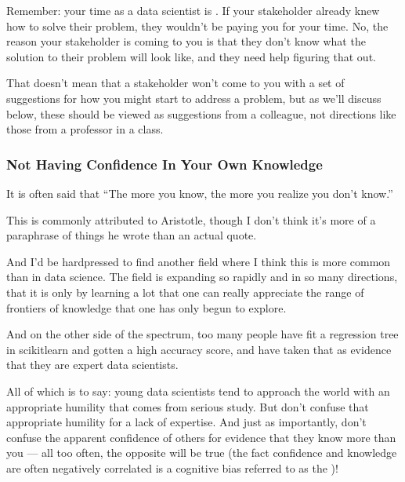 \documentclass[letterpaper,10pt,english]{jupyterBook}
\begin{document}
\sphinxAtStartPar
Remember: your time as a data scientist is . If your stakeholder already knew how to solve their problem, they wouldn’t be paying you for your time. No, the reason your stakeholder is coming to you is that they don’t know what the solution to their problem will look like, and they need help figuring that out.

\sphinxAtStartPar
That doesn’t mean that a stakeholder won’t come to you with a set of suggestions for how you might start to address a problem, but as we’ll discuss below, these should be viewed as suggestions from a colleague, not directions like those from a professor in a class.


\subsubsection{Not Having Confidence In Your Own Knowledge}
\label{\detokenize{20_problems_to_questions/20_stakeholder_management:not-having-confidence-in-your-own-knowledge}}
\sphinxAtStartPar
It is often said that “The more you know, the more you realize you don’t know.”%
\begin{footnote}[2]\sphinxAtStartFootnote
This is commonly attributed to Aristotle, though I don’t think it’s more of a paraphrase of things he wrote than an actual quote.
%
\end{footnote} And I’d be hard\sphinxhyphen{}pressed to find another field where I think this is more common than in data science. The field is expanding so rapidly and in so many directions, that it is only by learning a lot that one can really appreciate the range of frontiers of knowledge that one has only begun to explore.

\sphinxAtStartPar
And on the other side of the spectrum,  too many people have fit a regression tree in scikit\sphinxhyphen{}learn and gotten a high accuracy score, and have taken that as evidence that they are expert data scientists.

\sphinxAtStartPar
All of which is to say: young data scientists tend to approach the world with an appropriate humility that comes from serious study. But don’t confuse that appropriate humility for a lack of expertise. And just as importantly, don’t confuse the apparent confidence of others for evidence that they know more than you — all too often, the opposite will be true (the fact confidence and knowledge are often negatively correlated is a cognitive bias referred to as the )!
\end{document}
